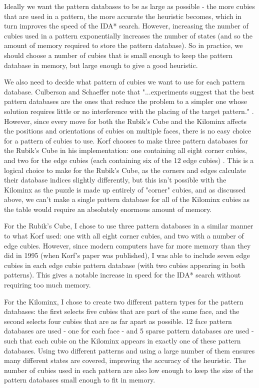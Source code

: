 Ideally we want the pattern databases to be as large as possible - the more cubies that are used in a pattern, the more accurate the heuristic becomes, which in turn improves the speed of the IDA* search. However, increasing the number of cubies used in a pattern exponentially increases the number of states (and so the amount of memory required to store the pattern database). So in practice, we should choose a number of cubies that is small enough to keep the pattern database in memory, but large enough to give a good heuristic.

We also need to decide what pattern of cubies we want to use for each pattern database. Culberson and Schaeffer note that "...experiments suggest that the best pattern databases are the ones that reduce the problem to a simpler one whose solution requires little or no interference with the placing of the target pattern." \cite{patterndatabases}. However, since every move for both the Rubik's Cube and the Kilominx affects the positions and orientations of cubies on multiple faces, there is no easy choice for a pattern of cubies to use. Korf chooses to make three pattern databases for the Rubik's Cube in his implementation: one containing all eight corner cubies, and two for the edge cubies (each containing six of the 12 edge cubies) \cite{korf}. This is a logical choice to make for the Rubik's Cube, as the corners and edges calculate their database indices slightly differently, but this isn't possible with the Kilominx as the puzzle is made up entirely of "corner" cubies, and as discussed above, we can't make a single pattern database for all of the Kilominx cubies as the table would require an absolutely enormous amount of memory.

For the Rubik's Cube, I chose to use three pattern databases in a similar manner to what Korf used: one with all eight corner cubies, and two with a number of edge cubies. However, since modern computers have far more memory than they did in 1995 (when Korf's paper was published), I was able to include seven edge cubies in each edge cubie pattern database (with two cubies appearing in both patterns). This gives a notable increase in speed for the IDA* search without requiring too much memory.

For the Kilominx, I chose to create two different pattern types for the pattern databases: the first selects five cubies that are part of the same face, and the second selects four cubies that are as far apart as possible. 12 face pattern databases are used - one for each face - and 5 sparse pattern databases are used - such that each cubie on the Kilominx appears in exactly one of these pattern databases. Using two different patterns and using a large number of them ensures many different states are covered, improving the accuracy of the heuristic. The number of cubies used in each pattern are also low enough to keep the size of the pattern databases small enough to fit in memory.

